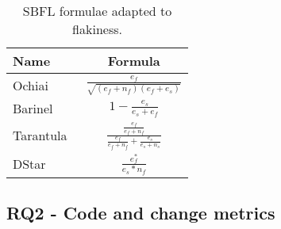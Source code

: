 \begin{table}
\vspace{-0.5em}
\centering
\caption{SBFL formulae adapted to flakiness.
\vspace{-0.5em}
\centering}
\label{tab:formulae}
\begin{tabular}{lc} 
\toprule
 \textbf{{Name}} & \textbf{{
Formula}}   \\  \hline
Ochiai~\cite{Abreu:2006yf} & $\frac{e_f}{\sqrt{(e_f + n_f)(e_f + e_s)}}$ \\ %
Barinel~\cite{abreu2009spectrum} & $1 - \frac{e_s}{e_s + e_f}$ \\ %
Tarantula~\cite{Jones:2001vn,Jones:2002kx} & $\frac{\frac{e_f}{e_f+n_f}}{\frac{e_f}{e_f+n_f}+\frac{e_s}{e_s+n_s}}$ \\ %
DStar~\cite{wong-dstar} & $\frac{e_f^*}{e_s * n_f}$ \\\bottomrule
\end{tabular}
\vspace{-6mm}
\end{table}
\subsection{RQ2 - Code and change metrics}

